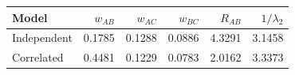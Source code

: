 \begin{tabular}{lrrrrr}
\toprule
Model & $w_{AB}$ & $w_{AC}$ & $w_{BC}$ & $R_{AB}$ & $1/\lambda_2$ \\
\midrule
Independent & 0.1785 & 0.1288 & 0.0886 & 4.3291 & 3.1458 \\
Correlated & 0.4481 & 0.1229 & 0.0783 & 2.0162 & 3.3373 \\
\bottomrule
\end{tabular}

